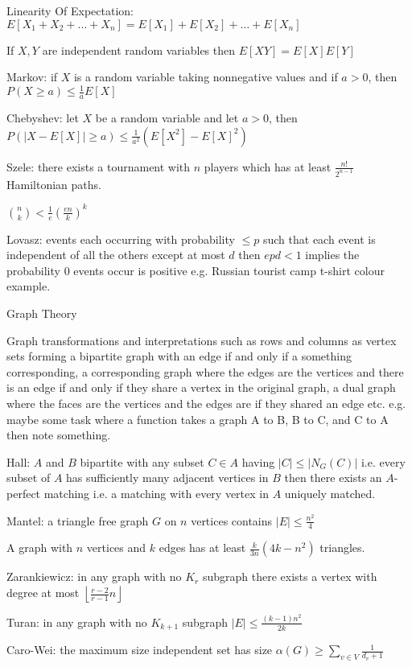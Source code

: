 Linearity Of Expectation: $E[X_1 + X_2 + \dots + X_n] = E[X_1] + E[X_2] + \dots + E[X_n]$

If $X,Y$ are independent random variables then $E[XY] = E[X]E[Y]$

Markov: if $X$ is a random variable taking nonnegative values and if $a>0$, then $P(X \ge a) \le \frac{1}{a} E[X]$

Chebyshev: let $X$ be a random variable and let $a>0$, then $P(|X-E[X]| \ge a) \le \frac{1}{a^2}(E[X^2]-E[X]^2)$

Szele: there exists a tournament with $n$ players which has at least $\frac{n!}{2^{n-1}}$ Hamiltonian paths.

$\binom{n}{k} < \frac{1}{e} \left( \frac{en}{k} \right)^k$

Lovasz: events each occurring with probability $\le p$ such that each event is independent of all the others except at most $d$ then $epd < 1$ implies the probability $0$ events occur is positive e.g. Russian tourist camp t-shirt colour example.

Graph Theory

Graph transformations and interpretations such as rows and columns as vertex sets forming a bipartite graph with an edge if and only if a something corresponding, a corresponding graph where the edges are the vertices and there is an edge if and only if they share a vertex in the original graph, a dual graph where the faces are the vertices and the edges are if they shared an edge etc. e.g. maybe some task where a function takes a graph A to B, B to C, and C to A then note something.

Hall: $A$ and $B$ bipartite with any subset $C \in A$ having $|C| \le |N_G (C)|$ i.e. every subset of $A$ has sufficiently many adjacent vertices in $B$ then there exists an $A$-perfect matching i.e. a matching with every vertex in $A$ uniquely matched.

Mantel: a triangle free graph $G$ on $n$ vertices contains $|E| \le \frac{n^2}{4}$

A graph with $n$ vertices and $k$ edges has at least $\frac{k}{3n}(4k-n^2)$ triangles.

Zarankiewicz: in any graph with no $K_r$ subgraph there exists a vertex with degree at most $\left\lfloor \frac{r-2}{r-1}n \right\rfloor$

Turan: in any graph with no $K_{k+1}$ subgraph $|E| \le \frac{(k-1)n^2}{2k}$

Caro-Wei: the maximum size independent set has size $\alpha (G) \ge \sum_{v \in V} \frac{1}{d_v+1}$

